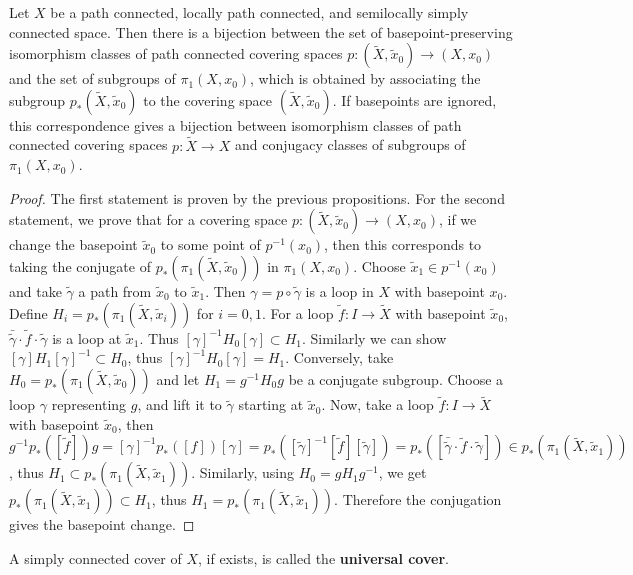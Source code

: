 \begin{thm} Let $X$ be a path connected, locally path connected, and semilocally simply connected space. Then there is a bijection between the set of basepoint-preserving isomorphism classes of path connected covering spaces $p:(\tilde{X},\tilde{x}_0)\rightarrow (X,x_0)$ and the set of subgroups of $\pi_1(X,x_0)$, which is obtained by associating the subgroup $p_*(\tilde{X},\tilde{x}_0)$ to the covering space $(\tilde{X},\tilde{x}_0)$. If basepoints are ignored, this correspondence gives a bijection between isomorphism classes of path connected covering spaces $p:\tilde{X}\rightarrow X$ and conjugacy classes of subgroups of $\pi_1(X,x_0)$.
\end{thm}
\begin{proof}
The first statement is proven by the previous propositions. For the second statement, we prove that for a covering space $p:(\tilde{X},\tilde{x}_0)\rightarrow (X,x_0)$, if we change the basepoint $\tilde{x}_0$ to some point of $p^{-1}(x_0)$, then this corresponds to taking the conjugate of $p_*(\pi_1(\tilde{X},\tilde{x}_0))$ in $\pi_1(X,x_0)$. Choose $\tilde{x}_1\in p^{-1}(x_0)$ and take $\tilde{\gamma}$ a path from $\tilde{x}_0$ to $\tilde{x}_1$. Then $\gamma=p\circ \tilde{\gamma}$ is a loop in $X$ with basepoint $x_0$. Define $H_i=p_*(\pi_1(\tilde{X},\tilde{x}_i))$ for $i=0,1$. For a loop $\tilde{f}:I\rightarrow \tilde{X}$ with basepoint $\tilde{x}_0$, $\bar{\tilde{\gamma}}\cdot \tilde{f}\cdot \tilde{\gamma}$ is a loop at $\tilde{x}_1$. Thus $[\gamma]^{-1}H_0[\gamma]\subset H_1$. Similarly we can show $[\gamma]H_1[\gamma]^{-1}\subset H_0$, thus $[\gamma]^{-1}H_0[\gamma]=H_1$. Conversely, take $H_0= p_*(\pi_1(\tilde{X},\tilde{x}_0))$ and let $H_1=g^{-1}H_0 g$ be a conjugate subgroup. Choose a loop $\gamma$ representing $g$, and lift it to $\tilde{\gamma}$ starting at $\tilde{x}_0$. Now, take a loop $\tilde{f}:I\rightarrow \tilde{X}$ with basepoint $\tilde{x}_0$, then $g^{-1}p_*([\tilde{f}])g=[\gamma]^{-1}p_*([f])[\gamma]=p_*([\tilde{\gamma}]^{-1}[\tilde{f}][\tilde{\gamma}])=p_*([\bar{\tilde{\gamma}}\cdot \tilde{f}\cdot \tilde{\gamma}])\in p_*(\pi_1(\tilde{X},\tilde{x}_1))$, thus $H_1\subset p_*(\pi_1(\tilde{X},\tilde{x}_1))$. Similarly, using $H_0=gH_1g^{-1}$, we get $p_*(\pi_1(\tilde{X},\tilde{x}_1))\subset H_1$, thus $H_1=p_*(\pi_1(\tilde{X},\tilde{x}_1))$. Therefore the conjugation gives the basepoint change.
\end{proof}

\begin{defn} A simply connected cover of $X$, if exists, is called the \textbf{universal cover}.
\end{defn}

